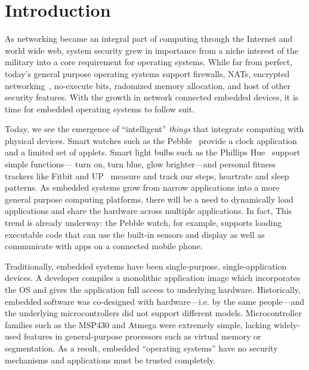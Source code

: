 \section{Introduction}

As networking became an integral part of computing through the Internet and
world wide web, system security grew in importance from a niche interest of the
military into a core requirement for operating systems. While far from perfect,
today's general purpose operating systems support firewalls, NATs, encrypted
networking~\cite{tcpcrypt}, no-execute bits, radomized memory allocation, and
host of other security features. With the growth in network connected embedded
devices, it is time for embedded operating systems to follow suit.

Today, we see the emergence of ``intelligent'' \textit{things} that integrate
computing with physical devices. Smart watches such as the Pebble~\cite{pebble}
provide a clock application and a limited set of applets. Smart light bulbs such
as the Phillips Hue~\cite{hue} support simple functions--- turn on, turn blue,
glow brighter---and personal fitness trackers like Fitbit and
UP~\cite{fitbit,jawboneup} measure and track our steps, heartrate and sleep
patterns. As embedded systems grow from narrow applications into a more general
purpose computing platforms, there will be a need to dynamically load
applications and share the hardware across multiple applications. In fact, This
trend is already underway: the Pebble watch, for example, supports loading
executable code that can use the built-in sensors and display as well as
communicate with apps on a connected mobile phone.


Traditionally, embedded systems have been single-purpose, single-application
devices. A developer compiles a monolithic application image which incorporates
the OS and gives the application full access to underlying hardware.
Historically, embedded software was co-designed with hardware---i.e. by the same
people---and the underlying microcontrollers did not support different models.
Microcontroller families such as the MSP430 and Atmega were extremely simple,
lacking widely-used features in general-purpose processors such as virtual
memory or segmentation. As a result, embedded ``operating systems'' have no
security mechanisms and applications must be trusted completely.


